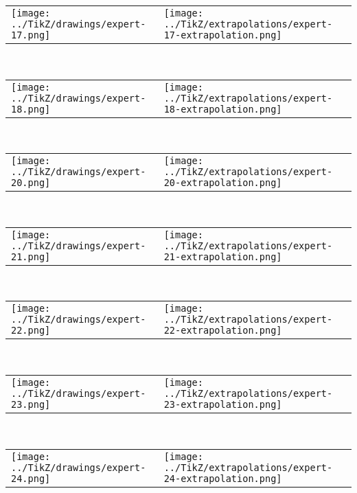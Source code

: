             \begin{tabular}{ll}
    \texttt{[image: ../TikZ/drawings/expert-17.png]}&
    \texttt{[image: ../TikZ/extrapolations/expert-17-extrapolation.png]}
    \end{tabular}        
            \\

            \begin{tabular}{ll}
    \texttt{[image: ../TikZ/drawings/expert-18.png]}&
    \texttt{[image: ../TikZ/extrapolations/expert-18-extrapolation.png]}
    \end{tabular}        
            \\

            \begin{tabular}{ll}
    \texttt{[image: ../TikZ/drawings/expert-20.png]}&
    \texttt{[image: ../TikZ/extrapolations/expert-20-extrapolation.png]}
    \end{tabular}        
            \\

            \begin{tabular}{ll}
    \texttt{[image: ../TikZ/drawings/expert-21.png]}&
    \texttt{[image: ../TikZ/extrapolations/expert-21-extrapolation.png]}
    \end{tabular}        
            \\

            \begin{tabular}{ll}
    \texttt{[image: ../TikZ/drawings/expert-22.png]}&
    \texttt{[image: ../TikZ/extrapolations/expert-22-extrapolation.png]}
    \end{tabular}        
            \\

            \begin{tabular}{ll}
    \texttt{[image: ../TikZ/drawings/expert-23.png]}&
    \texttt{[image: ../TikZ/extrapolations/expert-23-extrapolation.png]}
    \end{tabular}        
            \\

            \begin{tabular}{ll}
    \texttt{[image: ../TikZ/drawings/expert-24.png]}&
    \texttt{[image: ../TikZ/extrapolations/expert-24-extrapolation.png]}
    \end{tabular}        
            \\

